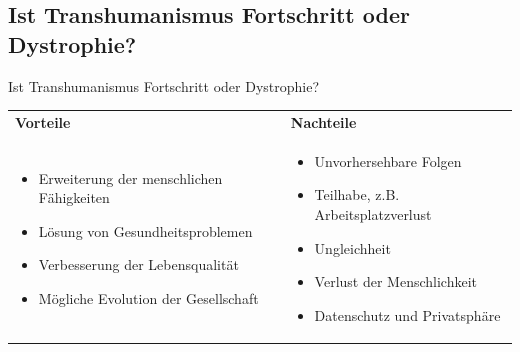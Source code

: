 \documentclass[aspectratio=169,16pt,xcolor=table]{beamer}
\begin{document}

\subsection{Ist Transhumanismus Fortschritt oder Dystrophie?}
  \begin{frame}{Ist Transhumanismus Fortschritt oder Dystrophie?}
    \begin{center}
    


\begin{tabular}{|p{6.5cm}|p{6.5cm}|}
    \hline
    \cellcolor{green!40}\textbf{Vorteile}  & \cellcolor{red!50}\textbf{Nachteile} \\
            \small
            \begin{itemize}
                \item Erweiterung der menschlichen Fähigkeiten
                \item Lösung von Gesundheitsproblemen
                \item Verbesserung der Lebensqualität
                \item Mögliche Evolution der Gesellschaft
            \end{itemize}
            & 
            \begin{itemize}
                \item Unvorhersehbare Folgen
                \item Teilhabe, z.B. Arbeitsplatzverlust
                \item Ungleichheit
                \item Verlust der Menschlichkeit
                \item Datenschutz und Privatsphäre
            \end{itemize} \\
        \hline
    \end{tabular}
    \end{center}
\end{frame}

\printbibliography %
\end{document}
